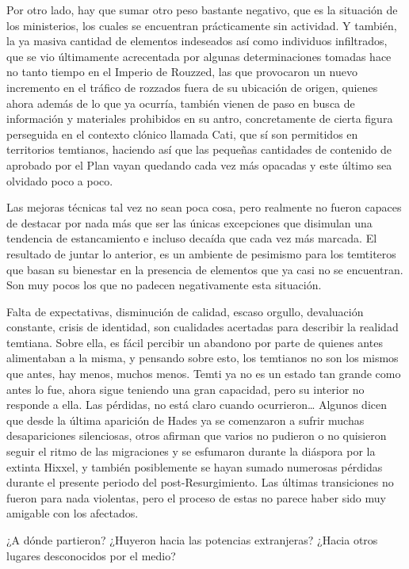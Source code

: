 \documentclass[
  spanish,
]{book}
\begin{document}
Por otro lado, hay que sumar otro peso bastante negativo, que es la situación de los ministerios, los cuales se encuentran prácticamente sin actividad. Y también, la ya masiva cantidad de elementos indeseados así como individuos infiltrados, que se vio últimamente acrecentada por algunas determinaciones tomadas hace no tanto tiempo en el Imperio de Rouzzed, las que provocaron un nuevo incremento en el tráfico de rozzados fuera de su ubicación de origen, quienes ahora además de lo que ya ocurría, también vienen de paso en busca de información y materiales prohibidos en su antro, concretamente de cierta figura perseguida en el contexto clónico llamada Cati, que sí son permitidos en territorios temtianos, haciendo así que las pequeñas cantidades de contenido de aprobado por el Plan vayan quedando cada vez más opacadas y este último sea olvidado poco a poco.

Las mejoras técnicas tal vez no sean poca cosa, pero realmente no fueron capaces de destacar por nada más que ser las únicas excepciones que disimulan una tendencia de estancamiento e incluso decaída que cada vez más marcada. El resultado de juntar lo anterior, es un ambiente de pesimismo para los temtiteros que basan su bienestar en la presencia de elementos que ya casi no se encuentran. Son muy pocos los que no padecen negativamente esta situación.

Falta de expectativas, disminución de calidad, escaso orgullo, devaluación constante, crisis de identidad, son cualidades acertadas para describir la realidad temtiana. Sobre ella, es fácil percibir un abandono por parte de quienes antes alimentaban a la misma, y pensando sobre esto, los temtianos no son los mismos que antes, hay menos, muchos menos. Temti ya no es un estado tan grande como antes lo fue, ahora sigue teniendo una gran capacidad, pero su interior no responde a ella. Las pérdidas, no está claro cuando ocurrieron\ldots{} Algunos dicen que desde la última aparición de Hades ya se comenzaron a sufrir muchas desapariciones silenciosas, otros afirman que varios no pudieron o no quisieron seguir el ritmo de las migraciones y se esfumaron durante la diáspora por la extinta Hixxel, y también posiblemente se hayan sumado numerosas pérdidas durante el presente periodo del post-Resurgimiento. Las últimas transiciones no fueron para nada violentas, pero el proceso de estas no parece haber sido muy amigable con los afectados.

¿A dónde partieron? ¿Huyeron hacia las potencias extranjeras? ¿Hacia otros lugares desconocidos por el medio?
\end{document}
